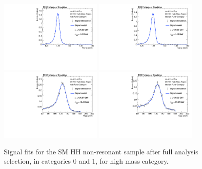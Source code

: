 \begin{figure}[thb]
  \centering
  \includegraphics[width=0.45\textwidth]{figures/sec-signals/SMHM_signal_fit_mgg_cat0}\hfil
  \includegraphics[width=0.45\textwidth]{figures/sec-signals/SMHM_signal_fit_mgg_cat1}\hfil
  \includegraphics[width=0.45\textwidth]{figures/sec-signals/SMHM_signal_fit_mjj_cat0}\hfil
  \includegraphics[width=0.45\textwidth]{figures/sec-signals/SMHM_signal_fit_mjj_cat1}\hfil
  \caption{Signal fits for the SM HH non-resonant sample after full analysis selection, in categories 0 and 1, for high mass category.}
  \label{fig:sig_highmassSM}
\end{figure}

